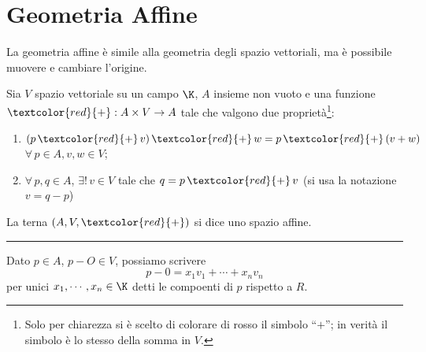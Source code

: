 \section{Geometria Affine}

La geometria affine è simile alla geometria degli spazio vettoriali, ma è possibile muovere e cambiare l'origine.

Sia $ V $ spazio vettoriale su un campo $ \K $, $ A $ insieme non vuoto e una funzione $ \textcolor{red}{+}:A\times V \to A $ tale che valgono due proprietà\footnote{Solo per chiarezza si è scelto di colorare di rosso il simbolo ``$+$''; in verità il simbolo è lo stesso della somma in $ V $.}: \begin{enumerate}
    \item $ (p\,\textcolor{red}{+}\,v)\,\textcolor{red}{+}\,w=p\,\textcolor{red}{+}\,(v+w) $ $ \forall\, p \in A, v,w \in V $;
    \item $ \forall\, p,q \in A $, $ \exists!\, v \in V $ tale che $ q=p\,\textcolor{red}{+}\,v $ (si usa la notazione $ v=q-p $)
\end{enumerate}

La terna $ (A, V, \textcolor{red}{+}) $ si dice uno spazio affine.




\rule{7em}{.4pt}

Dato $ p \in A $, $ p-O \in V $, possiamo scrivere \[
    p-0 = x_1v_1 + \cdots + x_{n}v_{n}  
    \] per unici $ x_1,\cdots,x_{n} \in \K $ detti le compoenti di $ p $ rispetto a $ R $.


